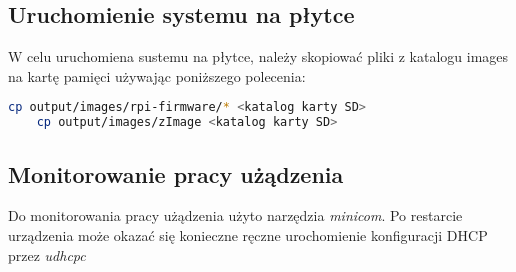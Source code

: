 \subsection{Uruchomienie systemu na płytce}
W celu uruchomiena sustemu na płytce, należy skopiować pliki z katalogu images na kartę pamięci używając poniższego polecenia:
	\begin{lstlisting}[language=bash]
	cp output/images/rpi-firmware/* <katalog karty SD>
	cp output/images/zImage <katalog karty SD>
	\end{lstlisting}	
	
\subsection{Monitorowanie pracy użądzenia}
Do monitorowania pracy użądzenia użyto narzędzia \emph{minicom}. Po restarcie urządzenia może okazać się konieczne ręczne urochomienie konfiguracji DHCP przez \emph{udhcpc}





